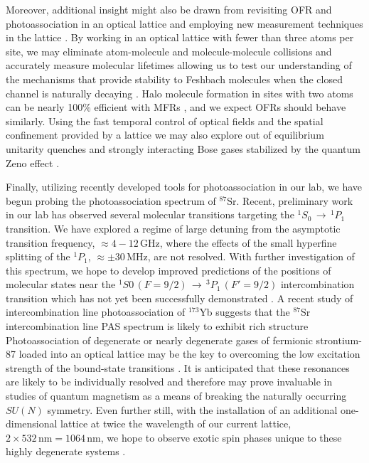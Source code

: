 Moreover, additional insight might also be drawn from revisiting OFR and photoassociation in an optical lattice and employing new measurement techniques in the lattice \cite{Taie2016}. 
By working in an optical lattice with fewer than three atoms per site, we may eliminate atom-molecule and molecule-molecule collisions and accurately measure molecular lifetimes \cite{Thalhammer2006,lsb08} allowing us to test our understanding of the mechanisms that provide stability to Feshbach molecules when the closed channel is naturally decaying \cite{Kohler2005}. 
Halo molecule formation in sites with two atoms can be nearly 100\% efficient with MFRs \cite{Mies2000,Chin2010}, and we expect OFRs should behave similarly.
Using the fast temporal control of optical fields and the spatial confinement provided by a lattice we may also explore out of equilibrium unitarity quenches \cite{Makotyn2014} and strongly interacting Bose gases stabilized by the quantum Zeno effect \cite{fgr01,Zhu2014,Daley2009,Syassen2008}.

Finally, utilizing recently developed tools for photoassociation in our lab, we have begun probing the photoassociation spectrum of $^{87}$Sr.
Recent, preliminary work in our lab has observed several molecular transitions targeting the $^1S_0\,\rightarrow\,^1P_1$ transition.
We have explored a regime of large detuning from the asymptotic transition frequency, $\approx 4-12\,$GHz, where the effects of the small hyperfine splitting of the $^1P_1$, $\approx \pm30\,$MHz, are not resolved.
With further investigation of this spectrum, we hope to develop improved predictions of the positions of molecular states near the $^1S0\,(F=9/2)\,\rightarrow\,^3P_1\,(F'=9/2)$ intercombination transition which has not yet been successfully demonstrated \cite{Reschovsky}.
A recent study of intercombination line photoassociation of $^{173}$Yb suggests that the $^{87}$Sr intercombination line PAS spectrum is likely to exhibit rich structure \cite{Han2018a, Franchi2017,Kim2016}
Photoassociation of degenerate or nearly degenerate gases of fermionic strontium-87 loaded into an optical lattice may be the key to overcoming the low excitation strength of the bound-state transitions \cite{bhm12,tys12}.
It is anticipated that these resonances are likely to be individually resolved \cite{Han2018a} and therefore may prove invaluable in studies of quantum magnetism as a means of breaking the naturally occurring $SU(N)$ symmetry.
Even further still, with the installation of an additional one-dimensional lattice at twice the wavelength of our current lattice, $2\times 532\,\text{nm} = 1064\,$nm, we hope to observe exotic spin phases unique to these highly degenerate systems \cite{Beverland2016,cre14,Chen2015, pbl08, Gorshkov2010,Scazza2014, ftc07,Cappellini2014}. 

